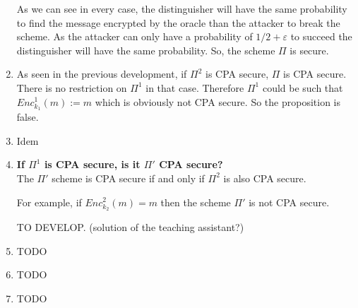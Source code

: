 \begin{solution}
\begin{enumerate}
\begin{center}
	\end{center}
	As we can see in every case, the distinguisher will have the same probability to find the message encrypted by the oracle than the attacker to break the scheme. As the attacker can only have a probability of $1/2 + \varepsilon$ to succeed the distinguisher will have the same probability. So, the scheme $\Pi$ is secure.
	
	\item As seen in the previous development, if $\Pi^2$ is CPA secure, $\Pi$ is CPA secure. There is no restriction on $\Pi^1$ in that case. Therefore $\Pi^1$ could be such that $Enc^1_{k_1}(m):=m$ which is obviously not CPA secure. So the proposition is false.
	
	\item Idem
	
	\item \textbf{If $\Pi^1$ is CPA secure, is it $\Pi'$ CPA secure?}\\
	The $\Pi'$ scheme is CPA secure if and only if $\Pi^2$ is also CPA secure.
	
	For example, if $Enc_{k_2}^2(m) = m$ then the scheme $\Pi'$ is not CPA secure.
	
	TO DEVELOP. (solution of the teaching assistant?)
	
	\item TODO
	
	\item TODO
	
	\item TODO
\end{enumerate}

\end{solution}

